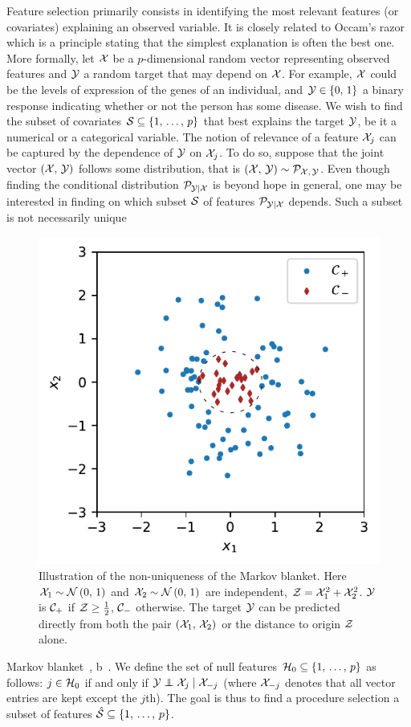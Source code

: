 Feature selection primarily consists in identifying the most relevant features (or covariates)
explaining an observed variable.
It is closely related to Occam's razor which is a principle stating that
the simplest explanation is often the best one.
More formally, let $\mathcal{X}$ be a $p$-dimensional random vector representing observed features
and $\mathcal{Y}$ a random target that may depend on $\mathcal{X}$.
For example, $\mathcal{X}$ could be the levels of expression of the genes of an individual,
and $\mathcal{Y} \in \left\{ 0,\, 1 \right\}$ a binary response indicating whether or not the person has some disease.
We wish to find the subset of covariates $\mathcal{S} \subseteq \left\{ 1,\, \dots,\, p \right\}$ that best explains the target $\mathcal{Y}$,
be it a numerical or a categorical variable.
The notion of relevance of a feature $\mathcal{X}_j$ can be captured by the dependence of $\mathcal{Y}$ on $\mathcal{X}_j$.
To do so, suppose that the joint vector $\left( \mathcal{X},\, \mathcal{Y} \right)$ follows some distribution,
that is $\left( \mathcal{X},\, \mathcal{Y} \right) \sim \mathcal{P}_{\mathcal{X},\, \mathcal{Y}}$.
Even though finding the conditional distribution $\mathcal{P}_{\mathcal{Y} \mid \mathcal{X}}$ is beyond hope in general,
one may be interested in finding on which subset $\mathcal{S}$ of features $\mathcal{P}_{\mathcal{Y} \mid \mathcal{X}}$ depends.
Such a subset is not necessarily unique
\begin{figure}[h]
    \centering
    \includegraphics[width=0.4\linewidth]{figures/fs_subset_not_unique.pdf}
    \caption{
        Illustration of the non-uniqueness of the Markov blanket.
        Here $\mathcal{X}_1 \sim \mathcal{N}\left( 0,\, 1 \right)$
        and $\mathcal{X}_2 \sim \mathcal{N}\left( 0,\, 1 \right)$ are independent,
        $\mathcal{Z} = \mathcal{X}_1^2 + \mathcal{X}_2^2$.
        $\mathcal{Y}$ is $\mathcal{C}_+$ if $\mathcal{Z} \geq \frac{1}{2}$,
        $\mathcal{C}_-$ otherwise.
        The target $\mathcal{Y}$ can be predicted directly from both the pair $\left( \mathcal{X}_1,\, \mathcal{X}_2 \right)$
        or the distance to origin $\mathcal{Z}$ alone.
    }
    \label{fig:fs_subset_not_unique}
\end{figure}
Markov blanket~\cite{markov_blanket}, b~\cite{markov_blanket_fs}.
We define the set of null features $\mathcal{H}_0 \subseteq \left\{ 1,\, \dots,\, p \right\}$ as follows:
$j \in \mathcal{H}_0$ if and only if $\cY \independent \cX_j \mid \cX_{-j}$
(where $\mathcal{X}_{-j}$ denotes that all vector entries are kept except the $j$th).
The goal is thus to find a procedure selection a subset of features
$\hat{\mathcal{S}} \subseteq \left\{ 1,\, \dots,\, p \right\}$.

